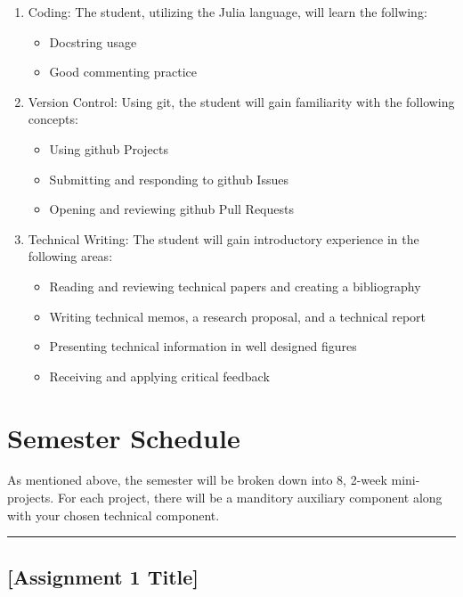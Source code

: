 \documentclass[12pt]{article}
\begin{document}
\begin{enumerate}
	\item Coding: The student, utilizing the Julia language, will learn the follwing:
	\begin{itemize}
		\item Docstring usage
		\item Good commenting practice
	\end{itemize}
	\item Version Control: Using git, the student will gain familiarity with the following concepts:
	\begin{itemize}
		\item Using github Projects
		\item Submitting and responding to github Issues
		\item Opening and reviewing github Pull Requests
	\end{itemize}
	\item Technical Writing: The student will gain introductory experience in the following areas:
	\begin{itemize}
		\item Reading and reviewing technical papers and creating a bibliography
		\item Writing technical memos, a research proposal, and a technical report
		\item Presenting technical information in well designed figures
		\item Receiving and applying critical feedback
	\end{itemize}
\end{enumerate}





\section{Semester Schedule}
\label{sec:semesterschedule}

As mentioned above, the semester will be broken down into 8, 2-week mini-projects.  For each project, there will be a manditory auxiliary component along with your chosen technical component.



\vspace{1em}\hrule
\subsection{[Assignment 1 Title]}
\label{ssec:a1}
\end{document}
